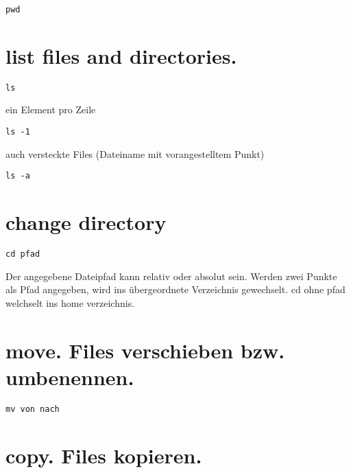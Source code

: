 \documentclass[]{book}
\begin{document}
\begin{verbatim}
pwd
\end{verbatim}

\hypertarget{list-files-and-directories.}{%
\section{list files and directories.}\label{list-files-and-directories.}}

\begin{verbatim}
ls
\end{verbatim}

ein Element pro Zeile

\begin{verbatim}
ls -1
\end{verbatim}

auch versteckte Files (Dateiname mit vorangestelltem Punkt)

\begin{verbatim}
ls -a
\end{verbatim}

\hypertarget{change-directory}{%
\section{change directory}\label{change-directory}}

\begin{verbatim}
cd pfad
\end{verbatim}

Der angegebene Dateipfad kann relativ oder absolut sein. Werden zwei Punkte als Pfad angegeben, wird ins übergeordnete Verzeichnis gewechselt.
cd ohne pfad welchselt ins home verzeichnis.

\hypertarget{move.-files-verschieben-bzw.-umbenennen.}{%
\section{move. Files verschieben bzw. umbenennen.}\label{move.-files-verschieben-bzw.-umbenennen.}}

\begin{verbatim}
mv von nach
\end{verbatim}

\hypertarget{copy.-files-kopieren.}{%
\section{copy. Files kopieren.}\label{copy.-files-kopieren.}}
\end{document}
